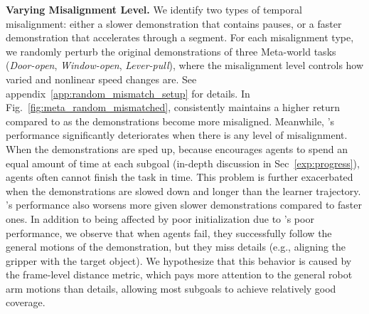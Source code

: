 \textbf{Varying Misalignment Level.}
We identify two types of temporal misalignment: either a slower demonstration that contains pauses, or a faster demonstration that accelerates through a segment.
For each misalignment type, we randomly perturb the original demonstrations of three Meta-world tasks (\textit{Door-open}, \textit{Window-open}, \textit{Lever-pull}), where the misalignment level controls how varied and nonlinear speed changes are. 
See appendix~\ref{app:random_mismatch_setup} for details.
In Fig.~\ref{fig:meta_random_mismatched}, \orca{} consistently maintains a higher return compared to \tot{} as the demonstrations become more misaligned. 
Meanwhile, \tot{}'s performance significantly deteriorates when there is any level of misalignment.
When the demonstrations are sped up, because \tot{} encourages agents to spend an equal amount of time at each subgoal (in-depth discussion in Sec~\ref{exp:progress}), \tot{} agents often cannot finish the task in time. 
This problem is further exacerbated when the demonstrations are slowed down and longer than the learner trajectory.
\orca{}'s performance also worsens more given slower demonstrations compared to faster ones.
In addition to being affected by poor initialization due to \tot{}'s poor performance, we observe that when \orca{} agents fail, they successfully follow the general motions of the demonstration, but they miss details (e.g., aligning the gripper with the target object). 
We hypothesize that this behavior is caused by the frame-level distance metric, which pays more attention to the general robot arm motions than details, allowing most subgoals to achieve relatively good coverage. 



